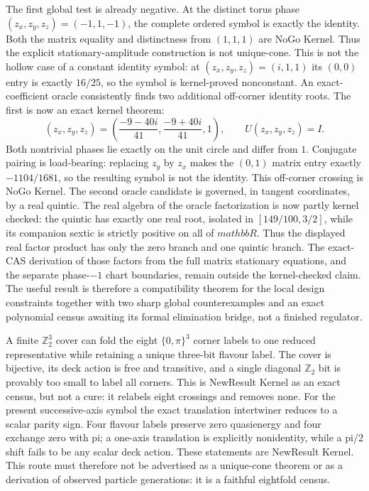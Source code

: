 \documentclass[11pt]{article}
\begin{document}
The first global test is already negative.  At the distinct torus phase
$(z_x,z_y,z_z)=(-1,1,-1)$, the complete ordered symbol is exactly the identity.
Both the matrix equality and distinctness from $(1,1,1)$ are NoGo{}
Kernel{}.  Thus the explicit stationary-amplitude construction is not
unique-cone.  This is not the hollow case of a constant identity symbol: at
$(z_x,z_y,z_z)=(i,1,1)$ its $(0,0)$ entry is exactly $16/25$, so the symbol is
kernel-proved nonconstant.  An exact-coefficient oracle consistently finds two
additional off-corner identity roots.  The first is now an exact kernel
theorem:
\[
 (z_x,z_y,z_z)=
 \left(\frac{-9-40i}{41},\frac{-9+40i}{41},1\right),
 \qquad U(z_x,z_y,z_z)=I.
\]
Both nontrivial phases lie exactly on the unit circle and differ from $1$.
Conjugate pairing is load-bearing: replacing $z_y$ by $z_x$ makes the
$(0,1)$ matrix entry exactly $-1104/1681$, so the resulting symbol is not the
identity.  This off-corner crossing is NoGo{} Kernel{}.  The second oracle
candidate is governed, in tangent coordinates, by a real quintic.  The real
algebra of the oracle factorization is now partly kernel checked: the quintic
has exactly one real root, isolated in $[149/100,3/2]$, while its companion
sextic is strictly positive on all of $mathbb R$.  Thus the displayed real
factor product has only the zero branch and one quintic branch.  The exact-CAS
derivation of those factors from the full matrix stationary equations, and the
separate phase-$-1$ chart boundaries, remain outside the kernel-checked claim.
The useful result is therefore a compatibility theorem for the local design
constraints together with two sharp global counterexamples and an exact
polynomial census awaiting its formal elimination bridge, not a finished
regulator.

A finite $\mathbb Z_2^3$ cover can fold the eight $\{0,\pi\}^3$ corner labels
to one reduced representative while retaining a unique three-bit flavour
label.  The cover is bijective, its deck action is free and transitive, and a
single diagonal $\mathbb Z_2$ bit is provably too small to label all corners.
This is NewResult{} Kernel{} as an exact census, but not a cure: it relabels
eight crossings and removes none.  For the present successive-axis symbol the
exact translation intertwiner reduces to a scalar parity sign.  Four flavour
labels preserve zero quasienergy and four exchange zero with pi; a one-axis
translation is explicitly nonidentity, while a pi/2 shift fails to be any
scalar deck action.  These statements are NewResult{} Kernel{}.  This route
must therefore not be advertised as a unique-cone theorem or as a derivation
of observed particle generations: it is a faithful eightfold census.
\end{document}
